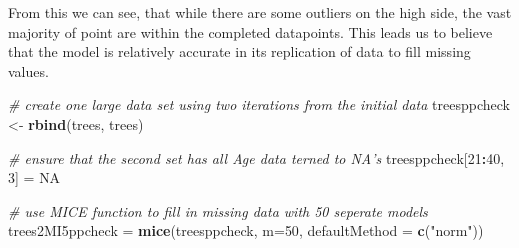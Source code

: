 \documentclass[]{article}
\newenvironment{Shaded}{\begin{snugshade}}{\end{snugshade}}
\newcommand{\KeywordTok}[1]{\textcolor[rgb]{0.13,0.29,0.53}{\textbf{#1}}}
\newcommand{\DataTypeTok}[1]{\textcolor[rgb]{0.13,0.29,0.53}{#1}}
\newcommand{\DecValTok}[1]{\textcolor[rgb]{0.00,0.00,0.81}{#1}}
\newcommand{\StringTok}[1]{\textcolor[rgb]{0.31,0.60,0.02}{#1}}
\newcommand{\CommentTok}[1]{\textcolor[rgb]{0.56,0.35,0.01}{\textit{#1}}}
\newcommand{\OtherTok}[1]{\textcolor[rgb]{0.56,0.35,0.01}{#1}}
\newcommand{\OperatorTok}[1]{\textcolor[rgb]{0.81,0.36,0.00}{\textbf{#1}}}
\newcommand{\NormalTok}[1]{#1}
\begin{document}
From this we can see, that while there are some outliers on the high
side, the vast majority of point are within the completed datapoints.
This leads us to believe that the model is relatively accurate in its
replication of data to fill missing values.

\begin{Shaded}
\begin{Highlighting}[]
\CommentTok{# create one large data set using two iterations from the initial data }
\NormalTok{treesppcheck <-}\StringTok{ }\KeywordTok{rbind}\NormalTok{(trees, trees)}

\CommentTok{# ensure that the second set has all Age data terned to NA's}
\NormalTok{treesppcheck[}\DecValTok{21}\OperatorTok{:}\DecValTok{40}\NormalTok{, }\DecValTok{3}\NormalTok{] =}\StringTok{ }\OtherTok{NA}

\CommentTok{# use MICE function to fill in missing data with 50 seperate models}
\NormalTok{trees2MI5ppcheck =}\StringTok{ }\KeywordTok{mice}\NormalTok{(treesppcheck, }\DataTypeTok{m=}\DecValTok{50}\NormalTok{, }\DataTypeTok{defaultMethod =} \KeywordTok{c}\NormalTok{(}\StringTok{"norm"}\NormalTok{))}
\end{Highlighting}
\end{Shaded}
\end{document}
